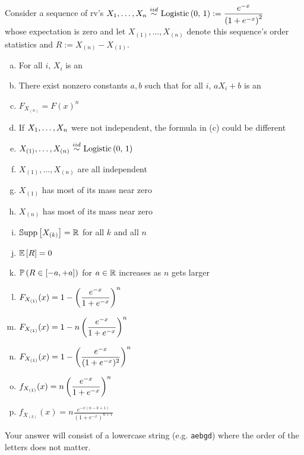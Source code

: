 \documentclass[12pt,landscape]{article}
\newcommand{\instr}{\small Your answer will consist of a lowercase string (e.g. \texttt{aebgd}) where the order of the letters does not matter. \normalsize}
\begin{document}
\problem{} Consider a sequence of rv's $\Xoneton \iid \logistic{0}{1} := \displaystyle \frac{e^{-x}}{\squared{1 + e^{-x}}}$ \\ whose expectation is zero and let $X_{(1)}, \ldots, X_{(n)}$ denote this sequence's order statistics and $R := X_{(n)} - X_{(1)}$.

\vspace{-0.2cm}\benum{} 

\begin{enumerate}[(a)]
\item For all $i$, $X_i$ is an 
\item There exist nonzero constants $a, b$ such that for all $i$, $a X_i + b$ is an 

\item $F_{X_{(n)}} = F(x)^n$
\item If $X_1, \ldots, X_n$ were not independent, the formula in (c) could be different

\item $X_{(1)}, \ldots, X_{(n)} \iid \logistic{0}{1}$
\item $X_{(1)}, \ldots, X_{(n)}$ are all independent
\item $X_{(1)}$ has most of its mass near zero
\item $X_{(n)}$ has most of its mass near zero

\item $\mathbb{S}\text{upp}\left[X_{(k)}\right] = \mathbb{R}$ for all $k$ and all $n$

\item $\mathbb{E}\left[R\right] = 0$

\item $\mathbb{P}\left(R \in [-a, +a]\right)$ for $a \in \mathbb{R}$ increases as $n$ gets larger

\item $F_{X_{(1)}}(x) = 1 - \left(\displaystyle \frac{e^{-x}}{1 + e^{-x}}\right)^{n}$ 
\item $F_{X_{(1)}}(x) = 1 - n\left(\displaystyle \frac{e^{-x}}{1 + e^{-x}}\right)^{n}$ 
\item $F_{X_{(1)}}(x) = 1 - \left(\displaystyle \frac{e^{-x}}{(1 + e^{-x})^2}\right)^{n}$ 

\item $f_{X_{(1)}}(x) = n \displaystyle\left(\displaystyle \frac{e^{-x}}{1 + e^{-x}}\right)^{n}$ 
\item $f_{X_{(k)}}(x) = n \displaystyle \frac{e^{-x(n-k+1)}}{(1 + e^{-x})^{n+1}} $  
\end{enumerate}
\eenum\instr\pagebreak
\end{document}

